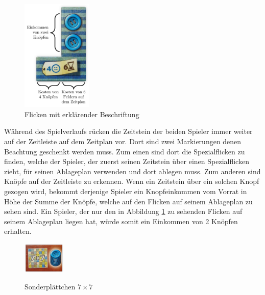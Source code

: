 \begin{figure}[!ht]
    \centering
    \includegraphics[width=0.3\textwidth]{res/pictures/annotated-patch.png}
    \caption{Flicken mit erklärender Beschriftung}
    \label{fig:patch-explanation}
\end{figure}

Während des Spielverlaufs rücken die Zeitstein der beiden Spieler immer weiter auf der Zeitleiste auf dem Zeitplan vor. Dort sind zwei Markierungen denen Beachtung geschenkt werden muss. Zum einen sind dort die Spezialflicken zu finden, welche der Spieler, der zuerst seinen Zeitstein über einen Spezialflicken zieht, für seinen Ablageplan verwenden und dort ablegen muss. Zum anderen sind Knöpfe auf der Zeitleiste zu erkennen. Wenn ein Zeitstein über ein solchen Knopf gezogen wird, bekommt derjenige Spieler ein Knopfeinkommen vom Vorrat in Höhe der Summe der Knöpfe, welche auf den Flicken auf seinem Ablageplan zu sehen sind. Ein Spieler, der nur den in Abbildung \ref{fig:patch-explanation} zu sehenden Flicken auf seinem Ablageplan liegen hat, würde somit ein Einkommen von 2 Knöpfen erhalten. \cite{2014.PatchworkSpielanleitung}

\pagebreak

\begin{figure}
    \centering
    \includegraphics[width=0.18\textwidth]{res/pictures/assets/special-tile.png}
    \caption[Sonderplättchen $7\times7$]{\unskip}
    Sonderplättchen $7\times7$
    \label{fig:special-tile}
\end{figure}

